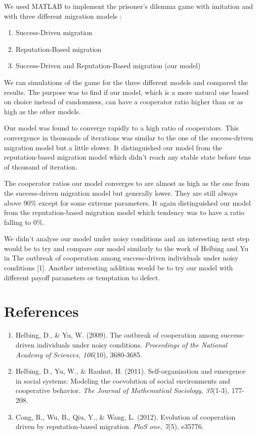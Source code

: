 \documentclass[11pt]{article}
\begin{document}
We used MATLAB to implement the prisoner's dilemma game with imitation and with three different migration models :
\begin{enumerate}
	\item Success-Driven migration
	\item Reputation-Based migration
	\item Success-Driven and Reputation-Based migration (our model)
\end{enumerate}
We ran simulations of the game for the three different models and compared the results. The purpose was to find if our model, which is a more natural one based on choice instead of randomness, can have a cooperator ratio higher than or as high as the other models.

Our model was found to converge rapidly to a high ratio of cooperators. This convergence in thousands of iterations was similar to the one of the success-driven migration model but a little slower. It distinguished our model from the reputation-based migration model which didn't reach any stable state before tens of thousand of iteration.

The cooperator ratios our model converges to are almost as high as the one from the success-driven migration model but generally lower. They are still always above 90\% except for some extreme parameters. It again distinguished our model from the reputation-based migration model which tendency was to have a ratio falling to 0\%.

We didn't analyse our model under noisy conditions and an interesting next step would be to try and compare our model similarly to the work of Helbing and Yu in The outbreak of cooperation among success-driven individuals under noisy conditions [1]. Another interesting addition would be to try our model with different payoff parameters or temptation to defect.




\section{References}

\begin{enumerate}
\item Helbing, D., \& Yu, W. (2009). The outbreak of cooperation among success-driven individuals under noisy conditions. \textit{Proceedings of the National Academy of Sciences, 106}(10), 3680-3685.
\item Helbing, D., Yu, W., \& Rauhut, H. (2011). Self-organization and emergence in social systems: Modeling the coevolution of social environments and cooperative behavior. \textit{The Journal of Mathematical Sociology, 35}(1-3), 177-208.
\item Cong, R., Wu, B., Qiu, Y., \& Wang, L. (2012). Evolution of cooperation driven by reputation-based migration. \textit{PloS one, 7}(5), e35776.
\end{enumerate}
\end{document}
